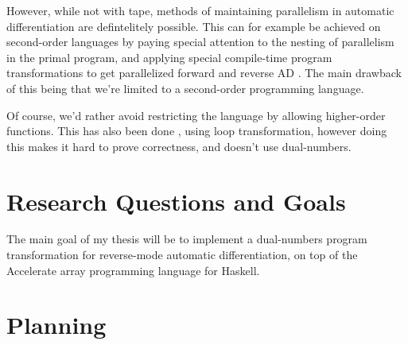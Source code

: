 \documentclass[a4paper]{article}
\begin{document}
            However, while not with tape, methods of maintaining parallelism in automatic differentiation are defintelitely possible.
            This can for example be achieved on second-order languages by paying special attention to the nesting of parallelism in the primal program, and applying special compile-time program transformations to get parallelized forward and reverse AD \cite{schenck2022ad}.
            The main drawback of this being that we're limited to a second-order programming language.

            Of course, we'd rather avoid restricting the language by allowing higher-order functions.
            This has also been done \cite{shaikhha2019efficient}, using loop transformation, however doing this makes it hard to prove correctness, and doesn't use dual-numbers.

    \section{Research Questions and Goals} \label{sec:questions}
        The main goal of my thesis will be to implement a dual-numbers program transformation for reverse-mode automatic differentiation, on top of the Accelerate array programming language for Haskell.

    \section{Planning} \label{sec:planning}

    \clearpage
    
    
\end{document}
